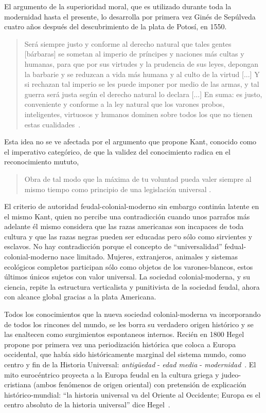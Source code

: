 \documentclass[a4paper,10pt]{book}
\theoremstyle{definition}
\begin{document}
El argumento de la superioridad moral, que es utilizado durante toda la modernidad hasta el presente, lo desarrolla por primera vez Ginés de Sepúlveda cuatro años después del descubrimiento de la plata de Potosí, en 1550.
\begin{quotation}
 Será siempre justo y conforme al derecho natural que tales gentes [bárbaras] se sometan al imperio de príncipes y naciones más cultas y humanas, para que por sus virtudes y la prudencia de sus leyes, depongan la barbarie y se reduzcan a vida más humana y al culto de la virtud [...] Y si rechazan tal imperio se les puede imponer por medio de las armas, y tal guerra será justa según el derecho natural lo declara [...] En suma: es justo, conveniente y conforme a la ley natural que los varones probos, inteligentes, virtuosos y humanos dominen sobre todos los que no tienen estas cualidades~\cite{GinesdeSepulveda1967p87}.
\end{quotation}
Esta idea no se ve afectada por el argumento que propone Kant, conocido como el imperativo categórico, de que la validez del conocimiento radica en el reconocimiento mututo,
\begin{quotation}
Obra de tal modo que la máxima de tu voluntad pueda valer siempre al mismo tiempo como principio de una legislación universal \cite{Kant2003:28}.
\end{quotation}
El criterio de autoridad feudal-colonial-moderno sin embargo continúa latente en el mismo Kant, quien no percibe una contradicción cuando unos parrafos más adelante él mismo considera que las razas americanas son incapaces de toda cultura y que las razas negras pueden ser educadas pero sólo como sirvientes y esclavos.
No hay contradicción porque el concepto de ``universalidad'' fedual-colonial-moderno nace limitado.
Mujeres, extranjeros, animales y sistemas ecológicos completos participan sólo como objetos de los varones-blancos, estos últimos únicos sujetos con valor universal.
La sociedad colonial-moderna, y su ciencia, repite la estructura verticalista y punitivista de la sociedad feudal, ahora con alcance global gracias a la plata Americana.


Todos los conocimientos que la nueva sociedad colonial-moderna va incorporando de todos los rincones del mundo, se les borra su verdadero origen histórico y se las enaltecen como surgimientos espontaneos internos.
Recién en 1800 Hegel propone por primera vez una periodización histórica que coloca a Europa occidental, que había sido históricamente marginal del sistema mundo, como centro y fin de la Historia Universal: \emph{antigüedad} - \emph{edad media} - \emph{modernidad}~\cite{dussel2007}. 
El mito eurocéntrico proyecta a la Europa feudal en la cultura griega y judeo-cristiana (ambos fenómenos de origen oriental) con pretensión de explicación histórico-mundial: ``la historia universal va del Oriente al Occidente; Europa es el centro absoluto de la historia universal'' dice Hegel~\cite{hegel}.
\end{document}
